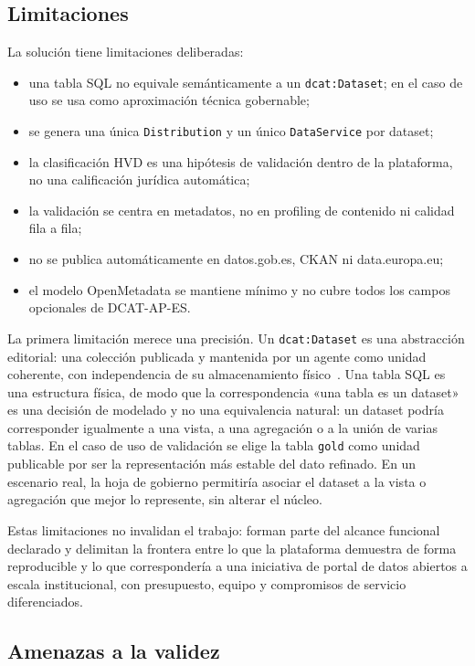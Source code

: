 \subsection{Limitaciones}

La solución tiene limitaciones deliberadas:

\begin{itemize}
  \item una tabla SQL no equivale semánticamente a un \texttt{dcat:Dataset}; en el caso de uso se usa como aproximación técnica gobernable;
  \item se genera una única \texttt{Distribution} y un único \texttt{DataService} por dataset;
  \item la clasificación HVD es una hipótesis de validación dentro de la plataforma, no una calificación jurídica automática;
  \item la validación se centra en metadatos, no en profiling de contenido ni calidad fila a fila;
  \item no se publica automáticamente en datos.gob.es, CKAN ni data.europa.eu;
  \item el modelo OpenMetadata se mantiene mínimo y no cubre todos los campos opcionales de DCAT-AP-ES.
\end{itemize}

La primera limitación merece una precisión. Un \texttt{dcat:Dataset} es una abstracción editorial: una colección publicada y mantenida por un agente como unidad coherente, con independencia de su almacenamiento físico~\cite{w3cDcat3}. Una tabla \ac{SQL} es una estructura física, de modo que la correspondencia «una tabla es un dataset» es una decisión de modelado y no una equivalencia natural: un dataset podría corresponder igualmente a una vista, a una agregación o a la unión de varias tablas. En el caso de uso de validación se elige la tabla \texttt{gold} como unidad publicable por ser la representación más estable del dato refinado. En un escenario real, la hoja de gobierno permitiría asociar el dataset a la vista o agregación que mejor lo represente, sin alterar el núcleo.

Estas limitaciones no invalidan el trabajo: forman parte del alcance funcional declarado y delimitan la frontera entre lo que la plataforma demuestra de forma reproducible y lo que correspondería a una iniciativa de portal de datos abiertos a escala institucional, con presupuesto, equipo y compromisos de servicio diferenciados.

\subsection{Amenazas a la validez}

